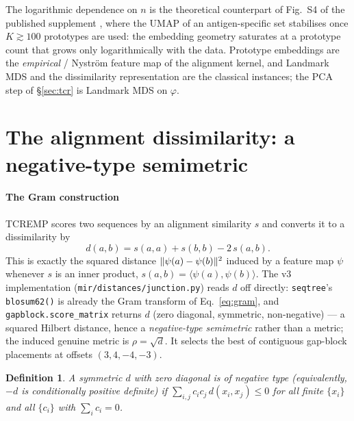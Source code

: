 \documentclass[11pt]{article}
\theoremstyle{oldplain}
\theoremstyle{oldrem}
\newtheorem{definition}{Definition}
\newcommand{\code}[1]{\texttt{#1}}
\DeclarePairedDelimiter{\norm}{\lVert}{\rVert}
\begin{document}
The logarithmic dependence on $n$ is the theoretical counterpart of Fig.~S4 of the published supplement
\cite{Kremlyakova2025}, where the
{\scshape UMAP} of an antigen-specific set stabilises once $K\gtrsim 100$ prototypes are used: the
embedding geometry saturates at a prototype count that grows only logarithmically with the data.
Prototype embeddings are the \emph{empirical} / Nystr\"om feature map of the alignment kernel, and
Landmark {\scshape MDS} \cite{deSilvaTenenbaum2004,FaloutsosLin1995} and the dissimilarity representation
\cite{PekalskaDuin2005} are the classical instances; the {\scshape PCA} step of \S\ref{sec:tcr} is
Landmark {\scshape MDS} on $\varphi$.

\section{The alignment dissimilarity: a negative-type semimetric}\label{sec:metric}

\paragraph{The Gram construction} {\scshape TCREMP} scores two sequences by an alignment similarity $s$
and converts it to a dissimilarity by
\begin{equation}\label{eq:gram}
  d(a,b) = s(a,a) + s(b,b) - 2\,s(a,b).
\end{equation}
This is exactly the squared distance $\norm{\psi(a)-\psi(b)}^2$ induced by a feature map $\psi$ whenever
$s$ is an inner product, $s(a,b)=\langle\psi(a),\psi(b)\rangle$. The v3 implementation
(\code{mir/distances/junction.py}) reads $d$ off directly: \code{seqtree}'s \code{blosum62()} is already
the Gram transform of Eq.~\eqref{eq:gram}, and \code{gapblock.score\_matrix} returns $d$ (zero diagonal,
symmetric, non-negative) --- a squared Hilbert distance, hence a \emph{negative-type semimetric} rather
than a metric; the induced genuine metric is $\rho=\sqrt d$. It selects the best of contiguous gap-block
placements at offsets $(3,4,-4,-3)$.

\begin{definition}
A symmetric $d$ with zero diagonal is of \emph{negative type} (equivalently, $-d$ is conditionally
positive definite) if $\sum_{i,j} c_i c_j\, d(x_i,x_j)\le 0$ for all finite $\{x_i\}$ and all
$\{c_i\}$ with $\sum_i c_i = 0$.
\end{definition}
\end{document}
